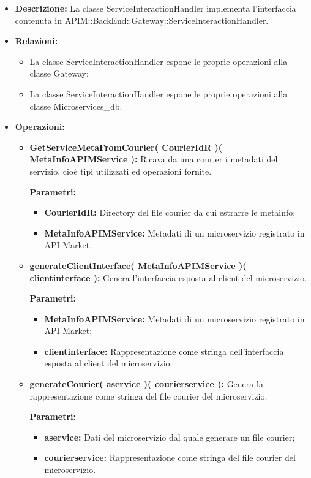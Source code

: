 \begin{itemize}
	\item \textbf{Descrizione:} La classe ServiceInteractionHandler implementa l'interfaccia contenuta in APIM::BackEnd::Gateway::ServiceInteractionHandler.
	\item \textbf{Relazioni:}
		\begin{itemize}
			\item La classe ServiceInteractionHandler espone le proprie operazioni alla classe Gateway;
			\item La classe ServiceInteractionHandler espone le proprie operazioni alla classe Microservices\_db.
		\end{itemize}
	\item \textbf{Operazioni:}
		\begin{itemize}
			\item \textbf{GetServiceMetaFromCourier( CourierIdR )( MetaInfoAPIMService ):} Ricava da una courier i metadati del servizio, cioè tipi utilizzati ed operazioni fornite.
				\begin{description}
    				\item[\textbf{Parametri:}]
				\end{description}
				\begin{itemize}
					\item \textbf{CourierIdR:} Directory del file courier da cui estrarre le metainfo;
					\item \textbf{MetaInfoAPIMService:} Metadati di un microservizio registrato in API Market.
				\end{itemize}
			\item \textbf{generateClientInterface( MetaInfoAPIMService )( clientinterface ):} Genera l'interfaccia esposta al client del microservizio.
				\begin{description}
    				\item[\textbf{Parametri:}]
				\end{description}
				\begin{itemize}
					\item \textbf{MetaInfoAPIMService:} Metadati di un microservizio registrato in API Market;
					\item \textbf{clientinterface:} Rappresentazione come stringa dell'interfaccia esposta al client del microservizio.
				\end{itemize}
			\item \textbf{generateCourier( aservice )( courierservice ):} Genera la rappresentazione come stringa del file courier del microservizio.
				\begin{description}
    				\item[\textbf{Parametri:}]
				\end{description}
				\begin{itemize}
					\item \textbf{aservice:} Dati del microservizio dal quale generare un file courier;
					\item \textbf{courierservice:} Rappresentazione come stringa del file courier del microservizio.
				\end{itemize}
		\end{itemize}
\end{itemize}



